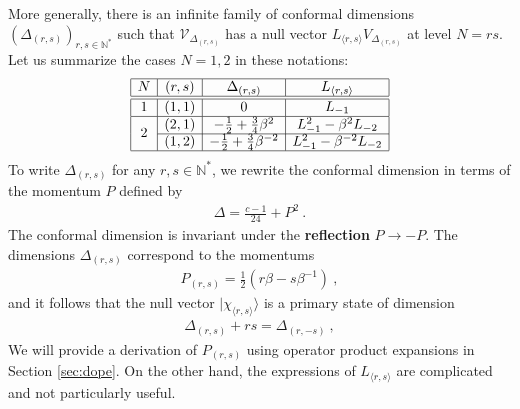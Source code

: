 \documentclass[12pt, a4paper]{article}
\theoremstyle{break}
\begin{document}
More generally, there is an infinite family of conformal dimensions $(\Delta_{(r, s)})_{r,s\in\mathbb{N}^*}$ such that $\mathcal{V}_{\Delta_{(r, s)}}$ has a null vector $L_{\langle r,s\rangle} V_{\Delta_{(r, s)}}$ at level $N=rs$. Let us summarize the cases $N=1,2$ in these notations:
\begin{align}
\begin{array}{|c|c|c|c|}
\hline 
N & (r, s) & \Delta_{(r, s)} &  L_{\langle r,s\rangle} 
\\
\hline\hline
1 & (1, 1) & 0 &  L_{-1}
\\
\hline
\multirow{2}{*}{2} & 
(2, 1) & -\frac12 + \frac34 \beta^{2}  & L_{-1}^2 -\beta^{2} L_{-2}
\\
\cline{2-4}
& (1, 2) & -\frac12 + \frac34 \beta^{-2} & L_{-1}^2 -\beta^{-2} L_{-2} 
\\
\hline
\end{array}
\label{ars}
\end{align}
To write $\Delta_{(r, s)}$ for any $r,s\in\mathbb{N}^*$, we rewrite the conformal dimension in terms of the momentum $P$ defined by 
\begin{align}
 \boxed{\Delta = \frac{c-1}{24} + P^2}\ .
 \label{dp}
\end{align}
The conformal dimension is invariant under the \textbf{reflection} $P\to -P$. The dimensions $\Delta_{(r, s)}$ correspond to the momentums 
\begin{align}
 \boxed{P_{(r, s)} = \frac12\left(r\beta -s\beta^{-1}\right)}\ ,
 \label{prs}
\end{align}
and it follows that the null vector $|\chi_{\langle r,s\rangle}\rangle$ is a primary state of dimension
\begin{align}
 \Delta_{(r, s)} + rs = \Delta_{(r, -s)}\ , 
 \label{drms}
\end{align}
We will provide a derivation of $P_{(r, s)}$ using operator product expansions in Section \ref{sec:dope}. On the other hand, the expressions of $L_{\langle r,s\rangle} $ are complicated and not particularly useful. 
\end{document}
